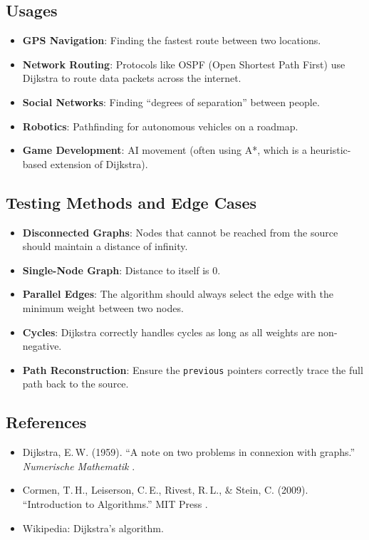 \subsection{Usages}
\begin{itemize}
  \item \textbf{GPS Navigation}: Finding the fastest route between two locations.
  \item \textbf{Network Routing}: Protocols like OSPF (Open Shortest Path First) use Dijkstra to route data packets across the internet.
  \item \textbf{Social Networks}: Finding ``degrees of separation'' between people.
  \item \textbf{Robotics}: Pathfinding for autonomous vehicles on a roadmap.
  \item \textbf{Game Development}: AI movement (often using A*, which is a heuristic-based extension of Dijkstra).
\end{itemize}

\subsection{Testing Methods and Edge Cases}
\begin{itemize}
  \item \textbf{Disconnected Graphs}: Nodes that cannot be reached from the source should maintain a distance of infinity.
  \item \textbf{Single-Node Graph}: Distance to itself is 0.
  \item \textbf{Parallel Edges}: The algorithm should always select the edge with the minimum weight between two nodes.
  \item \textbf{Cycles}: Dijkstra correctly handles cycles as long as all weights are non-negative.
  \item \textbf{Path Reconstruction}: Ensure the \texttt{previous} pointers correctly trace the full path back to the source.
\end{itemize}

\subsection{References}
\begin{itemize}
  \item Dijkstra, E.\,W. (1959). ``A note on two problems in connexion with graphs.'' \textit{Numerische Mathematik} \cite{dijkstra1959}.
  \item Cormen, T.\,H., Leiserson, C.\,E., Rivest, R.\,L., \& Stein, C. (2009). ``Introduction to Algorithms.'' MIT Press \cite{cormen2009}.
  \item Wikipedia: Dijkstra's algorithm.
\end{itemize}

